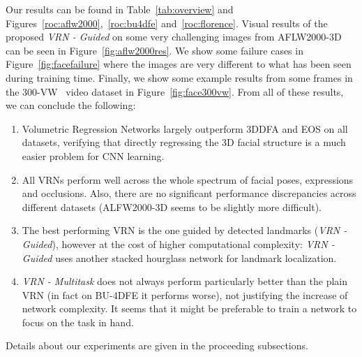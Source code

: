 Our results can be found in Table~\ref{tab:overview} and
Figures~\ref{roc:aflw2000},~\ref{roc:bu4dfe} and~\ref{roc:florence}.
Visual results of the proposed \textit{VRN - Guided} on some very
challenging images from AFLW2000-3D can be seen in
Figure~\ref{fig:aflw2000res}. We show some failure cases in
Figure~\ref{fig:facefailure} where the images are very different to
what has been seen during training time. Finally, we show some example
results from some frames in the 300-VW~\cite{sagonas2013300} video
dataset in Figure~\ref{fig:face300vw}. From all of these results, we
can conclude the following:
\begin{enumerate}
\item Volumetric Regression Networks largely outperform 3DDFA and EOS
  on all datasets, verifying that directly regressing the 3D facial
  structure is a much easier problem for CNN learning.
\item All VRNs perform well across the whole spectrum of facial poses,
  expressions and occlusions. Also, there are no significant performance
  discrepancies across different datasets (ALFW2000-3D seems to be
  slightly more difficult).
\item The best performing VRN is the one guided by detected landmarks
  (\textit{VRN - Guided}), however at the cost of higher computational
  complexity: \textit{VRN - Guided} uses another stacked hourglass
  network for landmark localization.
\item \textit{VRN - Multitask} does not always perform particularly
  better than the plain VRN (in fact on BU-4DFE it performs worse), not
  justifying the increase of network complexity. It seems that it might
  be preferable to train a network to focus on the task in hand.
\end{enumerate}

\noindent Details about our experiments are given in the proceeding subsections.

